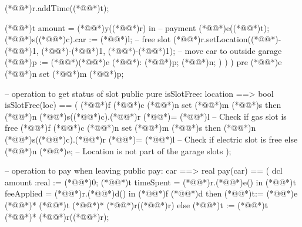 \documentclass[a4paper]{article}
\begin{document}
\begin{vdm_al}
                    (*@@*)r.addTime((*@@*)t);
                    
                    (*@@*)t amount = (*@@*)y((*@@*)r) in  -- payment
                    (*@@*)e((*@@*)t);
                    (*@@*)s((*@@*)c).car := (*@@*)l;  -- free slot
                    (*@@*)r.setLocation((*@\vdmnotcovered{}@*)-(*@\vdmnotcovered{}@*)1, (*@\vdmnotcovered{}@*)-(*@\vdmnotcovered{}@*)1, (*@\vdmnotcovered{}@*)-(*@\vdmnotcovered{}@*)1);  -- move car to outside garage
                    (*@@*)p := (*@\vdmnotcovered{}@*){(*@@*)e} (*@\vdmnotcovered{<-}@*): (*@@*)p;
                    (*@@*)n;
                )
            )    
)
pre (*@@*)e (*@@*)n set (*@@*)m (*@@*)p;


-- operation to get status of slot
public pure isSlotFree: location ==> bool
isSlotFree(loc) == (
    (*@@*)f (*@@*)c (*@@*)n set (*@@*)m (*@@*)s then
        (*@@*)n (*@@*)s((*@@*)c).(*@@*)r (*@\vdmnotcovered{}@*)= (*@@*)l  -- Check if gas slot is free
    (*@@*)f (*@@*)c (*@@*)n set (*@@*)m (*@@*)s then
        (*@@*)n (*@@*)s((*@@*)c).(*@@*)r (*@\vdmnotcovered{}@*)= (*@@*)l  -- Check if electric slot is free
    else (*@@*)n (*@@*)e;  -- Location is not part of the garage slots
);

-- operation to pay when leaving
public pay: car ==> real
pay(car) ==
(   
    dcl amount :real := (*@\vdmnotcovered{}@*)0;
    (*@@*)t timeSpent = (*@@*)r.(*@@*)e() in
    (*@@*)t feeApplied = (*@@*)r.(*@@*)d() in
    (*@@*)f (*@@*)d then
        (*@@*)t:= (*@@*)e (*@\vdmnotcovered{}@*)* (*@@*)t (*@\vdmnotcovered{}@*)* (*@@*)r((*@@*)r)
    else
        (*@@*)t := (*@@*)t (*@\vdmnotcovered{}@*)* (*@@*)r((*@@*)r);
    

\end{vdm_al}
\end{document}
